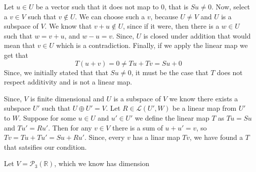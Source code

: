 \documentclass[10pt, twocolumn]{article}
\newcommand{\R}{\mathbb{R}}
\newcommand{\poly}[2]{\mathcal{P}_{#1}\left(#2\right)}
\begin{document}
\begin{q}[10]
	Let $ u \in U $ be a vector such that it does not map to 0, that is $ Su \neq 0 $. 
	Now, select a $ v \in V $ such that $ v \not\in U $. 
	We can choose such a $ v $, because $ U \neq V $ and $ U $ is a subspace of $ V $. 
	We know that $ v + u \not\in U $, since if it were, then there is a $ w \in U $ such that $ w = v + u $, 
	and $ w - u = v $. 
	Since, $ U $ is closed under addition that would mean that $ v \in U $ which is a contradiction. 
	Finally, if we apply the linear map we get that 
	$$ T(u + v)	 = 0 \neq Tu + Tv = Su + 0 $$
	Since, we initially stated that that $ Su \neq 0 $, it must be the case that $ T $ does not respect additivity and is not a linear map. 
\end{q}
\begin{q}[11]
	Since, $ V $ is finite dimensional and $ U $ is a subspace of $ V $ we know there exists a subspace $ U' $
	such that $ U \oplus U' = V $. 
	Let $ R \in \mathcal{L}(U', W) $ be a linear map from $U'$ to $ W $. 
	Suppose for some $ u \in U $ and $ u' \in U'$ we define the linear map $ T $ as
	$ Tu = Su $ and $ Tu' = Ru' $. 
	Then for any $ v \in V $ there is a sum of $ u + u' = v $, so  $ Tv = Tu + Tu' = Su + Ru' $. 
	Since, every $ v $ has a linar map $ Tv $, we have found a $ T $ that satsifies our condition.
\end{q}
\begin{q}[12]

\end{q}
\begin{q}[14]
	Let $ V = \poly{3}{\R} $, which we know has dimension 
\end{q}
\end{document}
